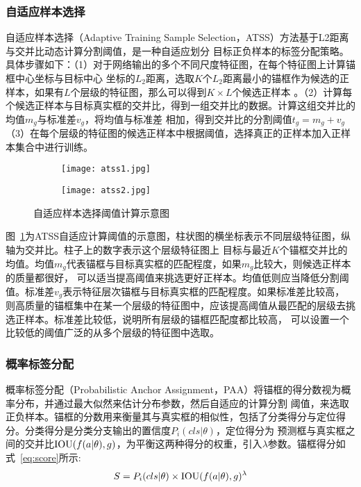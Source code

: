 \subsubsection{自适应样本选择}
自适应样本选择（Adaptive Training Sample Selection，ATSS）方法基于L2距离与交并比动态计算分割阈值，是一种自适应划分
目标正负样本的标签分配策略。具体步骤如下：（1）对于网络输出的多个不同尺度特征图，在每个特征图上计算锚框中心坐标与目标中心
坐标的$L_2$距离，选取$K$个$L_2$距离最小的锚框作为候选的正样本，如果有$L$个层级的特征图，那么可以得到$K \times L$个候选正样本
。（2）计算每个候选正样本与目标真实框的交并比，得到一组交并比的数据。计算这组交并比的均值$m_g$与标准差$v_g$，将均值与标准差
相加，得到交并比的分割阈值$t_g = m_g + v_g$（3）在每个层级的特征图的候选正样本中根据阈值，选择真正的正样本加入正样本集合中进行训练。

\begin{figure}[htbp]
	\centering
  \begin{subfigure}{0.48\linewidth}
    \centering
    \texttt{[image: atss1.jpg]}
    \caption{}
  \end{subfigure}
  \begin{subfigure}{0.48\linewidth}
    \centering
    \texttt{[image: atss2.jpg]}
    \caption{}
  \end{subfigure}
\caption{自适应样本选择阈值计算示意图}
	\label{fig:atss}
\end{figure}

图~\ref{fig:atss}为ATSS自适应计算阈值的示意图，柱状图的横坐标表示不同层级特征图，纵轴为交并比。柱子上的数字表示这个层级特征图上
目标与最近$K$个锚框交并比的均值。均值$m_g$代表锚框与目标真实框的匹配程度，如果$m_g$比较大，则候选正样本的质量都很好，
可以适当提高阈值来挑选更好正样本。均值低则应当降低分割阈值。标准差$v_g$表示特征层次锚框与目标真实框的匹配程度。如果标准差比较高，
则高质量的锚框集中在某一个层级的特征图中，应该提高阈值从最匹配的层级去挑选正样本。标准差比较低，说明所有层级的锚框匹配度都比较高，
可以设置一个比较低的阈值广泛的从多个层级的特征图中选取。

\subsubsection{概率标签分配}
概率标签分配（Probabilistic Anchor Assignment，PAA）将锚框的得分数视为概率分布，并通过最大似然来估计分布参数，然后自适应的计算分割
阈值，来选取正负样本。锚框的分数用来衡量其与真实框的相似性，包括了分类得分与定位得分。分类得分是分类分支输出的置信度${P_i}(cls|\theta )$，定位得分为
预测框与真实框之间的交并比${\rm{IOU}}(f(a|\theta ),g)$，为平衡这两种得分的权重，引入$\lambda$参数。锚框得分如式~\ref{eq:score}所示:
\begin{equation}   
  S = {P_i}(cls|\theta ) \times {\rm{IOU}}{(f(a|\theta ),g)^\lambda } 
  \label{eq:score} 
\end{equation}

